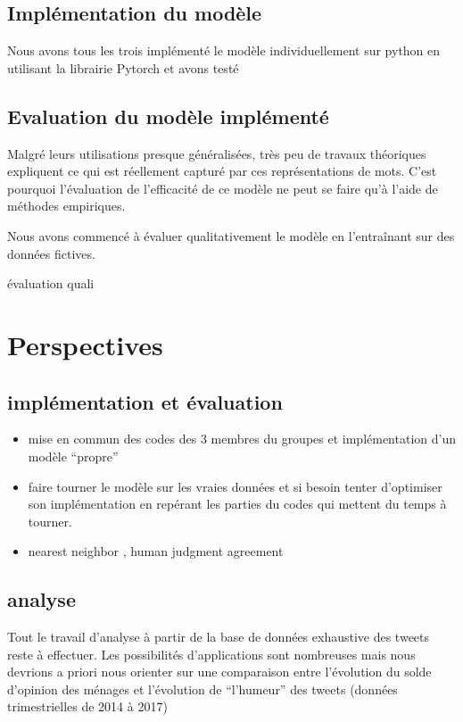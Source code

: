 \documentclass[11pt,french,french]{article}
\begin{document}
\hypertarget{impluxe9mentation-du-moduxe8le}{%
\subsection{Implémentation du
modèle}\label{impluxe9mentation-du-moduxe8le}}

Nous avons tous les trois implémenté le modèle individuellement sur
python en utilisant la librairie Pytorch et avons testé

\hypertarget{evaluation-du-moduxe8le-impluxe9mentuxe9}{%
\subsection{Evaluation du modèle
implémenté}\label{evaluation-du-moduxe8le-impluxe9mentuxe9}}

Malgré leurs utilisations presque généralisées, très peu de travaux
théoriques expliquent ce qui est réellement capturé par ces
représentations de mots. C'est pourquoi l'évaluation de l'efficacité de
ce modèle ne peut se faire qu'à l'aide de méthodes empiriques.

Nous avons commencé à évaluer qualitativement le modèle en l'entraînant
sur des données fictives.

évaluation quali

\hypertarget{perspectives}{%
\section{Perspectives}\label{perspectives}}

\hypertarget{impluxe9mentation-et-uxe9valuation}{%
\subsection{implémentation et
évaluation}\label{impluxe9mentation-et-uxe9valuation}}

\begin{itemize}
\item
  mise en commun des codes des 3 membres du groupes et implémentation
  d'un modèle ``propre''
\item
  faire tourner le modèle sur les vraies données et si besoin tenter
  d'optimiser son implémentation en repérant les parties du codes qui
  mettent du temps à tourner.
\item
  nearest neighbor , human judgment agreement
\end{itemize}

\hypertarget{analyse}{%
\subsection{analyse}\label{analyse}}

Tout le travail d'analyse à partir de la base de données exhaustive des
tweets reste à effectuer. Les possibilités d'applications sont
nombreuses mais nous devrions a priori nous orienter sur une comparaison
entre l'évolution du solde d'opinion des ménages et l'évolution de
``l'humeur'' des tweets (données trimestrielles de 2014 à 2017)
\end{document}
